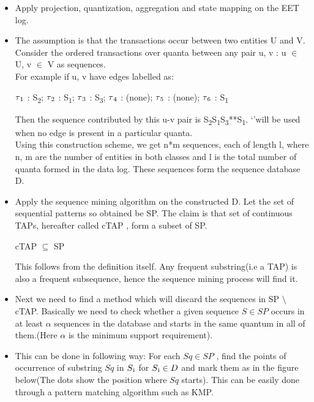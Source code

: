 \documentclass{article}
\begin{document}
\begin{itemize}
\item Apply projection, quantization, aggregation and state mapping on the EET log.
\item The assumption is that the transactions occur between two entities U and V. Consider the ordered transactions over quanta between any pair u, v : u $\in$ U, v $\in$ V as sequences. \\
For example if u, v have edges labelled as:
\begin{center}
$\tau\textsubscript{1}$ : S\textsubscript{2};  $\tau\textsubscript{2}$ : S\textsubscript{1};   $\tau\textsubscript{3}$ : S\textsubscript{3};   $\tau\textsubscript{4}$ : (none);   $\tau\textsubscript{5}$ : (none);   $\tau\textsubscript{6}$ : S\textsubscript{1}
\end{center}
Then the sequence contributed by this u-v pair is S\textsubscript{2}S\textsubscript{1}S\textsubscript{3}**S\textsubscript{1}. \lq*\rq  will be used when no edge is present in a particular quanta.\\
Using this construction scheme, we get n*m sequences, each of length l, where n, m are the number of entities in both classes and l is the total number of quanta formed in the data log. These sequences form the sequence database D.
\item Apply the sequence mining algorithm on the constructed D. Let the set of sequential patterns so obtained be SP. The claim is that set of continuous TAPs, hereafter called cTAP , form a subset of SP.\\
\begin{center}
cTAP $\subseteq$ SP 
\end{center}
This follows from the definition itself. Any frequent substring(i.e a TAP) is also a frequent subsequence, hence the sequence mining process will find it.
\item Next we need to find a method which will discard the sequences in SP $\setminus$ cTAP. Basically we need to check whether a given sequence $ S \in SP $ occurs in at least $\alpha$ sequences in the database and starts in the same quantum in all of them.(Here $\alpha$ is the minimum support requirement). 
\item This can be done in following way: For each $Sq \in SP$ , find the points of occurrence of substring $Sq$ in $S\textsubscript{i}$ for $S\textsubscript{i} \in D$ and mark them as in the figure below(The dots show the position where $Sq$ starts). This can be easily done through a pattern matching algorithm such as KMP. \\
\begin{center} 
\end{center}
\end{itemize}
\end{document}
